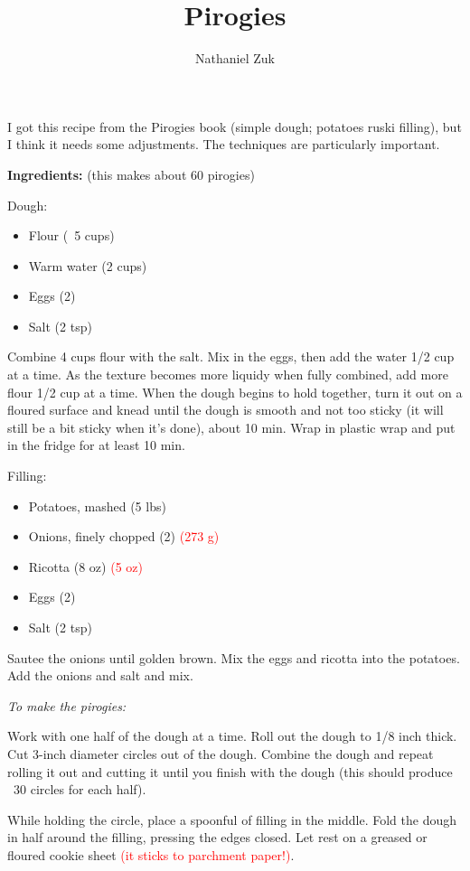 \documentclass[11pt]{article}
\title{Pirogies}
\author{Nathaniel Zuk}
\begin{document}
\maketitle

I got this recipe from the Pirogies book (simple dough; potatoes ruski filling), but I think it needs some adjustments.  The techniques are particularly important.

\textbf{Ingredients:} (this makes about 60 pirogies)

Dough:

\begin{itemize}
\item Flour (~5 cups)
\item Warm water (2 cups)
\item Eggs (2)
\item Salt (2 tsp)
\end{itemize}

Combine 4 cups flour with the salt.  Mix in the eggs, then add the water 1/2 cup at a time.  As the texture becomes more liquidy when fully combined, add more flour 1/2 cup at a time.  When the dough begins to hold together, turn it out on a floured surface and knead until the dough is smooth and not too sticky (it will still be a bit sticky when it's done), about 10 min.  Wrap in plastic wrap and put in the fridge for at least 10 min.

Filling:

\begin{itemize}
\item Potatoes, mashed (5 lbs)
\item Onions, finely chopped (2) \textcolor{red}{(273 g)}
\item Ricotta (8 oz) \textcolor{red}{(5 oz)}
\item Eggs (2)
\item Salt (2 tsp)
\end{itemize}

Sautee the onions until golden brown.  Mix the eggs and ricotta into the potatoes.  Add the onions and salt and mix.

\textit{To make the pirogies:}

Work with one half of the dough at a time.  Roll out the dough to 1/8 inch thick.  Cut 3-inch diameter circles out of the dough.  Combine the dough and repeat rolling it out and cutting it until you finish with the dough (this should produce ~30 circles for each half).

While holding the circle, place a spoonful of filling in the middle.  Fold the dough in half around the filling, pressing the edges closed.  Let rest on a greased or floured cookie sheet \textcolor{red}{(it sticks to parchment paper!)}.  
\end{document}
